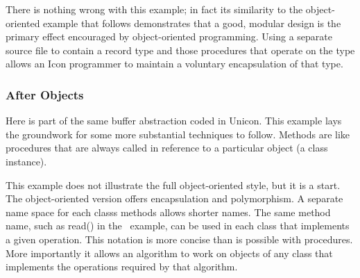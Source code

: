 
There is nothing wrong with this example; in fact its similarity to the
object-oriented example that follows demonstrates that a good, modular
design is the primary effect encouraged by object-oriented programming. Using a separate source file
to contain a record type and those procedures that operate on the type
allows an Icon programmer to maintain a voluntary encapsulation of that
type. 

\subsubsection{After Objects}
Here is part of the same buffer abstraction coded in Unicon. This
example lays the groundwork for some more substantial techniques to
follow. Methods are like procedures that are always called in reference
to a particular object (a class instance).


This example does not illustrate the full object-oriented style, but it
is a start. The object-oriented version offers encapsulation and
polymorphism. A separate name space for each class{\textquotesingle}s
methods allows shorter names. The same method name, such as
\textsf{read()} in the \ example, can be used in each class that
implements a given operation. This notation is more concise than is
possible with procedures. More importantly it allows an algorithm to
work on objects of any class that implements the operations required by
that algorithm. 

